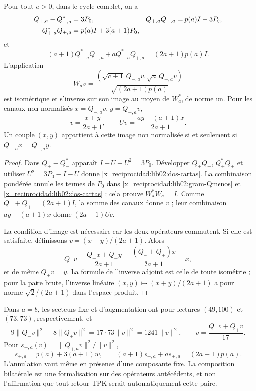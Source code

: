 \begin{theorem}
\label{x_reciprocidad:lib02:balance-bilateral}
Pour tout \(a>0\), dans le cycle complet, on a
\begin{align}
 Q_{+,a}-Q_{-,a}^*&=3P_0,&
 Q_{+,a}Q_{-,a}&=p(a)I-3P_0,\notag\\
 Q_{+,a}^*Q_{+,a}&=p(a)I+3(a+1)P_0,
 \label{x_reciprocidad:lib02:dos-cartas}
\end{align}
et
\begin{equation}
 (a+1)Q_{-,a}^*Q_{-,a}
 +aQ_{+,a}^*Q_{+,a}=(2a+1)p(a)I.
 \label{x_reciprocidad:lib02:balance-pesado}
\end{equation}
L'application
\begin{equation}
 W_av=\frac{(\sqrt{a+1}\,Q_{-,a}v,
                    \sqrt a\,Q_{+,a}v)}{\sqrt{(2a+1)p(a)}}
 \label{x_reciprocidad:lib02:W}
\end{equation}
est isométrique et s'inverse sur son image au moyen de \(W_a^*\), de norme un. Pour les canaux non normalisés \(x=Q_{-,a}v\), \(y=Q_{+,a}v\),
\begin{equation}
 v=\frac{x+y}{2a+1},\qquad
 Uv=\frac{ay-(a+1)x}{2a+1}.
 \label{x_reciprocidad:lib02:reconstruccion-bilateral}
\end{equation}
Un couple \((x,y)\) appartient à cette image non normalisée si et seulement si
\(Q_{+,a}x=Q_{-,a}y\).
\end{theorem}
\begin{proof}
Dans \(Q_+-Q_-^*\) apparaît \(I+U+U^2=3P_0\). Développer
\(Q_+Q_-\), \(Q_+^*Q_+\) et utiliser
\(U^2=3P_0-I-U\) donne \eqref{x_reciprocidad:lib02:dos-cartas}. La combinaison
pondérée annule les termes de \(P_0\) dans
\eqref{x_reciprocidad:lib02:gram-Qmenos} et \eqref{x_reciprocidad:lib02:dos-cartas} ; cela prouve
\(W_a^*W_a=I\). Comme \(Q_-+Q_+=(2a+1)I\), la somme des
canaux donne \(v\) ; leur combinaison \(ay-(a+1)x\) donne
\((2a+1)Uv\).

La condition d’image est nécessaire car les deux opérateurs commutent.
Si elle est satisfaite, définissons \(v=(x+y)/(2a+1)\). Alors
\[
 Q_-v=\frac{Q_-x+Q_-y}{2a+1}
 =\frac{(Q_-+Q_+)x}{2a+1}=x,
\]
et de même \(Q_+v=y\). La formule de l'inverse adjoint est celle de toute isométrie ; pour la paire brute, l'inverse linéaire \((x,y)\mapsto(x+y)/(2a+1)\) a pour norme \(\sqrt2/(2a+1)\) dans l'espace produit.
\end{proof}

Dans \(a=8\), les secteurs fixe et d’augmentation ont pour lectures
\((49,100)\) et \((73,73)\), respectivement, et
\[
 9\|Q_-v\|^2+8\|Q_+v\|^2=17\cdot73\|v\|^2=1241\|v\|^2,
 \qquad v=\frac{Q_-v+Q_+v}{17}.
\]
Pour \(s_{+,a}(v)=\|Q_{+,a}v\|^2/\|v\|^2\),
\[
 s_{+,a}=p(a)+3(a+1)w,
 \qquad (a+1)s_{-,a}+a s_{+,a}=(2a+1)p(a).
\]
L’annulation vaut même en présence d’une composante fixe. La composition bilatérale est
une formalisation sur des opérateurs antécédents, et non l’affirmation que
tout retour TPK serait automatiquement cette paire.

